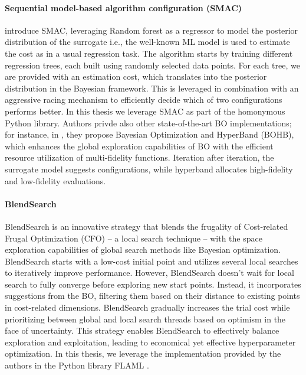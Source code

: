 \paragraph{Sequential model-based algorithm configuration (SMAC)} \cite{smac} introduce SMAC, leveraging Random forest \cite{20} as a regressor to model the posterior distribution of the surrogate i.e., the well-known ML model is used to estimate the cost as in a usual regression task.
The algorithm starts by training different regression trees, each built using randomly selected data points.
For each tree, we are provided with an estimation cost, which translates into the posterior distribution in the Bayesian framework.
This is leveraged in combination with an aggressive racing mechanism to efficiently decide which of two configurations performs better.
In this thesis we leverage SMAC as part of the homonymous Python library.
Authors privde also other state-of-the-art BO implementations; for instance, in \cite{falkner2018bohb}, they propose Bayesian Optimization and HyperBand (BOHB), which enhances the global exploration capabilities of BO with the efficient resource utilization of multi-fidelity functions.
Iteration after iteration, the surrogate model suggests configurations, while hyperband allocates high-fidelity and low-fidelity evaluations.


\paragraph{BlendSearch}
BlendSearch is an innovative strategy that blends the frugality of Cost-related Frugal Optimization (CFO) -- a local search technique -- with the space exploration capabilities of global search methods like Bayesian optimization.
BlendSearch starts with a low-cost initial point and utilizes several local searches to iteratively improve performance. However, BlendSearch doesn't wait for local search to fully converge before exploring new start points. Instead, it incorporates suggestions from the BO, filtering them based on their distance to existing points in cost-related dimensions. BlendSearch gradually increases the trial cost while prioritizing between global and local search threads based on optimism in the face of uncertainty. This strategy enables BlendSearch to effectively balance exploration and exploitation, leading to economical yet effective hyperparameter optimization.
In this thesis, we leverage the implementation provided by the authors in the Python library FLAML \cite{FLAML}.


